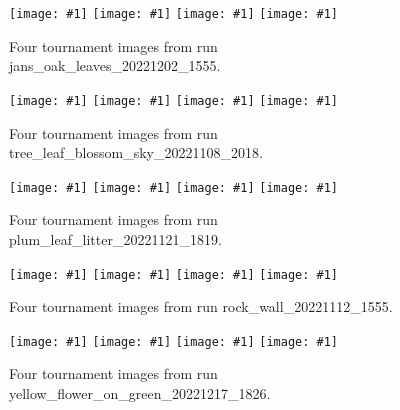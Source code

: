 \documentclass[acmtog]{acmart}
\newcommand{\igfour}[1]{\texttt{[image: \#1]}}
\begin{document}

\newpage






\begin{figure}
    \igfour{20221202_1555_step_6460.png}
    \hfill
    \igfour{20221202_1555_step_6560.png}
    \hfill
    \igfour{20221202_1555_step_6830.png}
    \hfill
    \igfour{20221202_1555_step_7124.png}
    \caption{Four tournament images from run jans\_oak\_leaves\_20221202\_1555.}
    \label{fig:jans_oak_leaves_4x}
\end{figure}

\begin{figure}
    \igfour{20221108_2018_step_4655.png}
    \hfill
    \igfour{20221108_2018_step_5498.png}
    \hfill
    \igfour{20221108_2018_step_5947.png}
    \hfill
    \igfour{20221108_2018_step_6562.png}
    \caption{Four tournament images from run tree\_leaf\_blossom\_sky\_20221108\_2018.}
    \label{fig:tree_leaf_blossom_sky_4x}
\end{figure}


\begin{figure}
    \igfour{20221121_1819_step_6324.png}
    \hfill
    \igfour{20221121_1819_step_6464.png}
    \hfill
    \igfour{20221121_1819_step_6677.png}
    \hfill
    \igfour{20221121_1819_step_6755.png}
    \caption{Four tournament images from run plum\_leaf\_litter\_20221121\_1819.}
    \label{fig:plum_leaf_litter_4x}
\end{figure}

\begin{figure}
    \igfour{20221112_1555_step_6495.png}
    \hfill
    \igfour{20221112_1555_step_5510.png}
    \hfill
    \igfour{20221112_1555_step_5681.png}
    \hfill
    \igfour{20221112_1555_step_6370.png}
    \caption{Four tournament images from run rock\_wall\_20221112\_1555.}
    \label{fig:rock_wall_4x}
\end{figure}

\begin{figure}
    \igfour{20221218_step_5396.png}
    \hfill
    \igfour{20221218_step_5641.png}
    \hfill
    \igfour{20221218_step_5947.png}
    \hfill
    \igfour{20221218_step_6753.png}
    \caption{Four tournament images from run yellow\_flower\_on\_green\_20221217\_1826.}
    \label{fig:yellow_flower_4x}
\end{figure}
\end{document}
